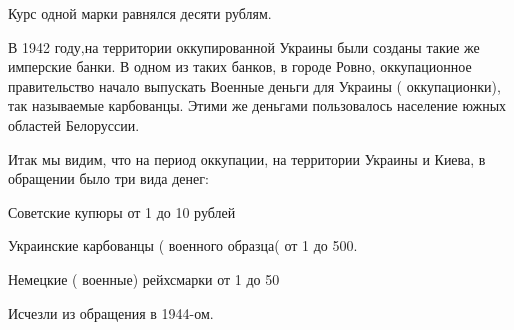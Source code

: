 
Курс одной марки равнялся десяти рублям.

В 1942 году,на территории оккупированной Украины были созданы такие же
имперские банки. В одном из таких банков, в городе Ровно, оккупационное
правительство начало выпускать Военные деньги для Украины ( оккупационки), так
называемые карбованцы. Этими же деньгами пользовалось население южных областей
Белоруссии.


Итак мы видим, что на период оккупации, на территории Украины и Киева, в
обращении было три вида денег:

Советские купюры от 1 до 10 рублей

Украинские карбованцы ( военного образца( от 1 до 500.

Немецкие ( военные) рейхсмарки от 1 до 50 

Исчезли из обращения в 1944-ом.

